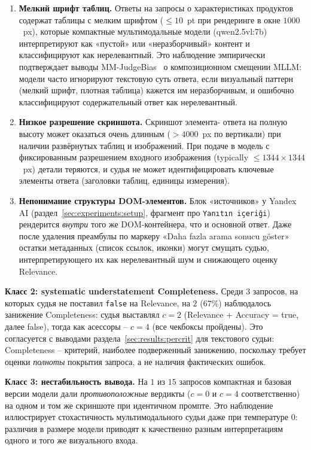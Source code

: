 \begin{enumerate}
    \item \textbf{Мелкий шрифт таблиц.} Ответы на запросы о
        характеристиках продуктов содержат таблицы с мелким шрифтом
        ($\le 10$~pt при рендеринге в окне $1000$~px), которые
        компактные мультимодальные модели (qwen2.5vl:7b)
        интерпретируют как «пустой» или «неразборчивый» контент и
        классифицируют как нерелевантный.
        Это наблюдение эмпирически подтверждает выводы MM-JudgeBias~\cite{lee2026mmjudgebias} о композиционном смещении MLLM: модели часто игнорируют текстовую суть ответа, если визуальный паттерн (мелкий шрифт, плотная таблица) кажется им неразборчивым, и ошибочно классифицируют содержательный ответ как нерелевантный.
    \item \textbf{Низкое разрешение скриншота.} Скриншот элемента-
        ответа на полную высоту может оказаться очень длинным
        ($> 4000$~px по вертикали) при наличии развёрнутых таблиц и
        изображений. При подаче в модель с фиксированным разрешением
        входного изображения (typically $\le 1344 \times 1344$~px)
        детали теряются, и судья не может идентифицировать ключевые
        элементы ответа (заголовки таблиц, единицы измерения).
    \item \textbf{Непонимание структуры DOM-элементов.} Блок
        «источников» у Yandex AI (раздел~\ref{sec:experiments:setup},
        фрагмент про \texttt{Yanıtın içeriği}) рендерится \emph{внутри}
        того же DOM-контейнера, что и основной ответ. Даже после
        удаления преамбулы по маркеру «Daha fazla arama sonucu
        göster» остатки метаданных (список ссылок, иконки) могут
        смущать судью, интерпретирующего их как нерелевантный шум
        и снижающего оценку Relevance.
\end{enumerate}

\textbf{Класс 2: systematic understatement Completeness.}
Среди $3$ запросов, на которых судья не поставил \texttt{false} на
Relevance, на $2$ ($67\%$) наблюдалось занижение Completeness:
судья выставлял $c = 2$ (Relevance + Accuracy = true, далее false),
тогда как асессоры -- $c = 4$ (все чекбоксы пройдены).
Это согласуется с выводами раздела~\ref{sec:results:percrit} для
текстового судьи: Completeness -- критерий, наиболее подверженный
занижению, поскольку требует оценки \emph{полноты} покрытия
запроса, а не наличия фактических ошибок.

\textbf{Класс 3: нестабильность вывода.}
На $1$ из $15$ запросов компактная и базовая версии модели дали
\emph{противоположные} вердикты ($c = 0$ и $c = 4$ соответственно)
на одном и том же скриншоте при идентичном промпте.
Это наблюдение иллюстрирует стохастичность мультимодального судьи
даже при температуре $0$: различия в размере модели приводят к
качественно разным интерпретациям одного и того же визуального
входа.

